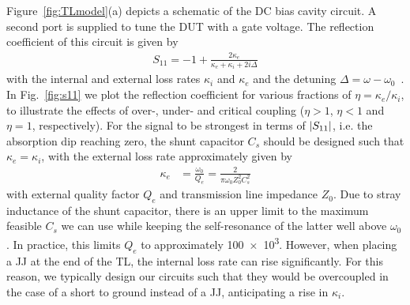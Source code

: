 Figure~\ref{fig:TLmodel}(a) depicts a schematic of the DC bias cavity circuit.
%
A second port is supplied to tune the DUT with a gate voltage.
%
The reflection coefficient of this circuit is given by
%
\begin{align}
S_{11}=-1+\frac{2\kappa_e}{\kappa_e+\kappa_i+2i\Delta}
\label{eq:intro-s11}
\end{align}
%
with the internal and external loss rates $\kappa_i$ and $\kappa_e$ and the detuning $\Delta=\omega-\omega_0$~\cite{bosmanBroadbandArchitectureGalvanically2015c}.
%
In Fig.~\ref{fig:s11} we plot the reflection coefficient for various fractions of $\eta =\kappa_e/\kappa_i$, to illustrate the effects of over-, under- and critical coupling ($\eta >1$, $\eta <1$ and $\eta =1$, respectively).
%
For the signal to be strongest in terms of $\lvert S_{11}\rvert$, i.e. the absorption dip reaching zero, the shunt capacitor $C_s$ should be designed such that $\kappa_e=\kappa_i$, with the external loss rate approximately given by
%
\begin{align}
\kappa_e &= \frac{\omega_0}{Q_e} = \frac{2}{\pi\omega_0Z_0^2C_s^2}
\label{eq:intro-kappae}
\end{align}
%
with external quality factor $Q_e$ and transmission line impedance $Z_0$.
%
Due to stray inductance of the shunt capacitor, there is an upper limit to the maximum feasible $C_s$ we can use while keeping the self-resonance of the latter well above $\omega_0$.
%
In practice, this limits $Q_e$ to approximately \num{100e3}.
%
However, when placing a JJ at the end of the TL, the internal loss rate can rise significantly.
%
For this reason, we typically design our circuits such that they would be overcoupled in the case of a short to ground instead of a JJ, anticipating a rise in $\kappa_i$.


